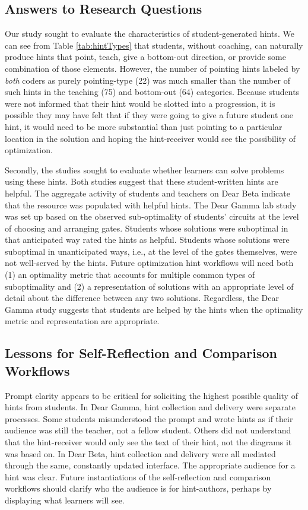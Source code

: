 \subsection{Answers to Research Questions}

Our study sought to evaluate the characteristics of student-generated hints. We can see from Table \ref{tab:hintTypes} that students, without coaching, can naturally produce hints that point, teach, give a bottom-out direction, or provide some combination of those elements. However, the number of pointing hints labeled by {\it both} coders as purely pointing-type (22) was much smaller than the number of such hints in the teaching (75) and bottom-out (64) categories. Because students were not informed that their hint would be slotted into a progression, it is possible they may have felt that if they were going to give a future student one hint, it would need to be more substantial than just pointing to a particular location in the solution and hoping the hint-receiver would see the possibility of optimization.

Secondly, the studies sought to evaluate whether learners can solve problems using these hints. Both studies suggest that these student-written hints are helpful. The aggregate activity of students and teachers on Dear Beta indicate that the resource was populated with helpful hints. The Dear Gamma lab study was set up based on the observed sub-optimality of students' circuits at the level of choosing and arranging gates. Students whose solutions were suboptimal in that anticipated way rated the hints as helpful. Students whose solutions were suboptimal in unanticipated ways, i.e., at the level of the gates themselves, were not well-served by the hints. Future optimization hint workflows will need both (1) an optimality metric that accounts for multiple common types of suboptimality and (2) a representation of solutions with an appropriate level of detail about the difference between any two solutions. Regardless, the Dear Gamma study suggests that students are helped by the hints when the optimality metric and representation are appropriate.

\subsection{Lessons for Self-Reflection and Comparison Workflows}

Prompt clarity appears to be critical for soliciting the highest possible quality of hints from students. In Dear Gamma, hint collection and delivery were separate processes. Some students misunderstood the prompt and wrote hints as if their audience was still the teacher, not a fellow student. Others did not understand that the hint-receiver would only see the text of their hint, not the diagrams it was based on. In Dear Beta, hint collection and delivery were all mediated through the same, constantly updated interface. The appropriate audience for a hint was clear. Future instantiations of the self-reflection and comparison workflows should clarify who the audience is for hint-authors, perhaps by displaying what learners will see. 

